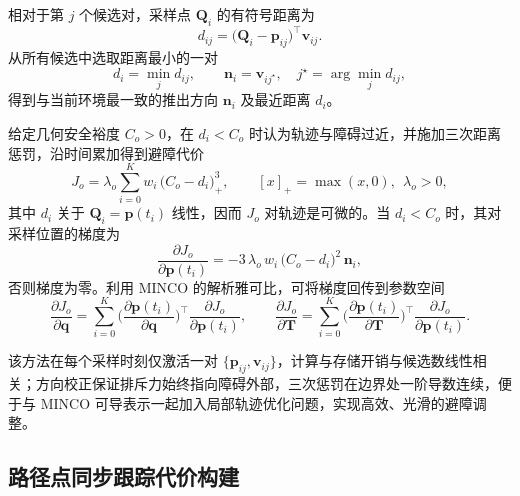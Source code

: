 相对于第 \(j\) 个候选对，采样点 \(\mathbf{Q}_i\) 的有符号距离为
\begin{equation}
\label{eq:pair_dist_all}
d_{ij}=\big(\mathbf{Q}_i-\mathbf{p}_{ij}\big)^\top \mathbf{v}_{ij}.
\end{equation}
从所有候选中选取距离最小的一对
\begin{equation}
\label{eq:active_pair_all}
d_i=\min_{j} d_{ij},\qquad 
\mathbf{n}_i=\mathbf{v}_{i j^\star},\quad j^\star=\arg\min_{j} d_{ij},
\end{equation}
得到与当前环境最一致的推出方向 \(\mathbf{n}_i\) 及最近距离 \(d_i\)。

给定几何安全裕度 \(C_o>0\)，在 \(d_i<C_o\) 时认为轨迹与障碍过近，并施加三次距离惩罚，沿时间累加得到避障代价
\begin{equation}
\label{eq:Jo_all}
J_{o}=\lambda_{o}\sum_{i=0}^{K} w_i\,\big(C_o-d_i\big)_{+}^{3},\qquad [x]_+=\max(x,0),\ \ \lambda_o>0,
\end{equation}
其中 \(d_i\) 关于 \(\mathbf{Q}_i=\mathbf{p}(t_i)\) 线性，因而 \(J_o\) 对轨迹是可微的。当 \(d_i<C_o\) 时，其对采样位置的梯度为
\begin{equation}
\label{eq:Jo_grad_p_all}
\frac{\partial J_o}{\partial \mathbf{p}(t_i)}=-3\,\lambda_{o}\,w_i\,\big(C_o-d_i\big)^{2}\,\mathbf{n}_i,
\end{equation}
否则梯度为零。利用 MINCO 的解析雅可比，可将梯度回传到参数空间
\begin{equation}
\label{eq:chain_rule_all}
\frac{\partial J_o}{\partial \mathbf{q}}
=\sum_{i=0}^{K}\!\Big(\frac{\partial \mathbf{p}(t_i)}{\partial \mathbf{q}}\Big)^{\!\top}\frac{\partial J_o}{\partial \mathbf{p}(t_i)},\qquad
\frac{\partial J_o}{\partial \mathbf{T}}
=\sum_{i=0}^{K}\!\Big(\frac{\partial \mathbf{p}(t_i)}{\partial \mathbf{T}}\Big)^{\!\top}\frac{\partial J_o}{\partial \mathbf{p}(t_i)}.
\end{equation}

该方法在每个采样时刻仅激活一对 \(\{\mathbf{p}_{ij},\mathbf{v}_{ij}\}\)，计算与存储开销与候选数线性相关；方向校正保证排斥力始终指向障碍外部，三次惩罚在边界处一阶导数连续，便于与 MINCO 可导表示一起加入局部轨迹优化问题，实现高效、光滑的避障调整。

\subsection{路径点同步跟踪代价构建}

